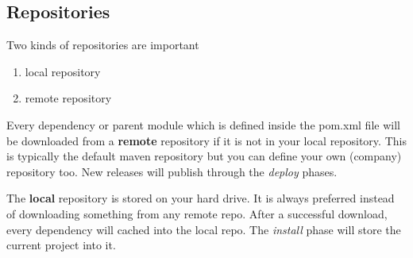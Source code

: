 \subsection{Repositories}
Two kinds of repositories are important
\begin{enumerate}
	\item local repository
	\item remote repository
\end{enumerate}
Every dependency or parent module which is defined inside the pom.xml file will be downloaded from a \textbf{remote} repository if it is not in your local repository. This is typically the default maven repository but you can define your own (company) repository too. New releases will publish through the \textit{deploy} phases. 

The \textbf{local} repository is stored on your hard drive. It is always preferred instead of downloading something from any remote repo. After a successful download, every dependency will cached into the local repo. The \textit{install} phase will store the current project into it. 